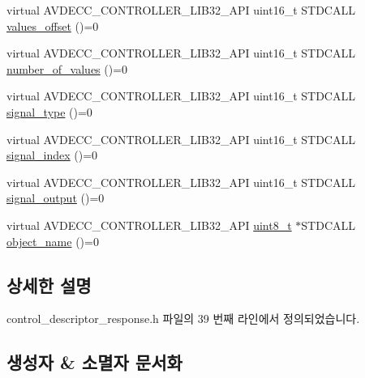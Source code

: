 \begin{DoxyCompactItemize}
\item 
virtual A\+V\+D\+E\+C\+C\+\_\+\+C\+O\+N\+T\+R\+O\+L\+L\+E\+R\+\_\+\+L\+I\+B32\+\_\+\+A\+PI uint16\+\_\+t S\+T\+D\+C\+A\+LL \hyperlink{classavdecc__lib_1_1control__descriptor__response_a4b716c566acc218087385fb85f07272e}{values\+\_\+offset} ()=0
\item 
virtual A\+V\+D\+E\+C\+C\+\_\+\+C\+O\+N\+T\+R\+O\+L\+L\+E\+R\+\_\+\+L\+I\+B32\+\_\+\+A\+PI uint16\+\_\+t S\+T\+D\+C\+A\+LL \hyperlink{classavdecc__lib_1_1control__descriptor__response_a3e66dc5ce2002e40973bbfd7e8d6b51e}{number\+\_\+of\+\_\+values} ()=0
\item 
virtual A\+V\+D\+E\+C\+C\+\_\+\+C\+O\+N\+T\+R\+O\+L\+L\+E\+R\+\_\+\+L\+I\+B32\+\_\+\+A\+PI uint16\+\_\+t S\+T\+D\+C\+A\+LL \hyperlink{classavdecc__lib_1_1control__descriptor__response_ac204637e5ecfc30b4cc47c0d78d81ce1}{signal\+\_\+type} ()=0
\item 
virtual A\+V\+D\+E\+C\+C\+\_\+\+C\+O\+N\+T\+R\+O\+L\+L\+E\+R\+\_\+\+L\+I\+B32\+\_\+\+A\+PI uint16\+\_\+t S\+T\+D\+C\+A\+LL \hyperlink{classavdecc__lib_1_1control__descriptor__response_aa1d83268f9a492f864d3e213acf71a97}{signal\+\_\+index} ()=0
\item 
virtual A\+V\+D\+E\+C\+C\+\_\+\+C\+O\+N\+T\+R\+O\+L\+L\+E\+R\+\_\+\+L\+I\+B32\+\_\+\+A\+PI uint16\+\_\+t S\+T\+D\+C\+A\+LL \hyperlink{classavdecc__lib_1_1control__descriptor__response_a729bc59f434e7de353db02db35977dfa}{signal\+\_\+output} ()=0
\item 
virtual A\+V\+D\+E\+C\+C\+\_\+\+C\+O\+N\+T\+R\+O\+L\+L\+E\+R\+\_\+\+L\+I\+B32\+\_\+\+A\+PI \hyperlink{stdint_8h_aba7bc1797add20fe3efdf37ced1182c5}{uint8\+\_\+t} $\ast$S\+T\+D\+C\+A\+LL \hyperlink{classavdecc__lib_1_1descriptor__response__base_a133f7774946d80f82b8aaaa4cfbb7361}{object\+\_\+name} ()=0
\end{DoxyCompactItemize}


\subsection{상세한 설명}


control\+\_\+descriptor\+\_\+response.\+h 파일의 39 번째 라인에서 정의되었습니다.



\subsection{생성자 \& 소멸자 문서화}
